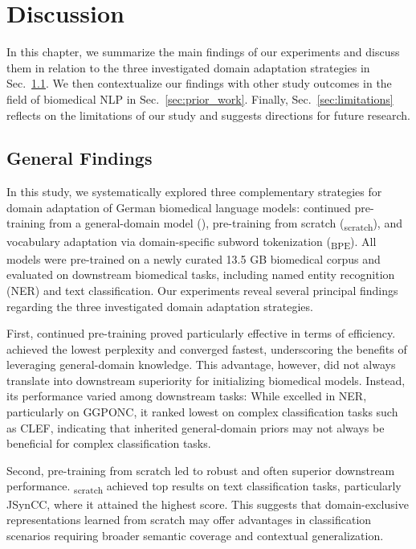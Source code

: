 \chapter{Discussion} \label{chap:discussion}

In this chapter, we summarize the main findings of our experiments and discuss
them in relation to the three investigated domain adaptation strategies in
Sec.~\ref{sec:findings}. We then contextualize our findings with other study
outcomes in the field of biomedical NLP in Sec.~\ref{sec:prior_work}. Finally,
Sec.~\ref{sec:limitations} reflects on the limitations of our study and suggests
directions for future research.

\section{General Findings} \label{sec:findings}

In this study, we systematically explored three complementary strategies for
domain adaptation of German biomedical language models: continued pre-training
from a general-domain model (\ChristBERT{}), pre-training from scratch
(\ChristBERT\textsubscript{scratch}), and vocabulary adaptation via
domain-specific subword tokenization (\ChristBERT\textsubscript{BPE}). All
models were pre-trained on a newly curated 13.5 GB biomedical corpus and
evaluated on downstream biomedical tasks, including named entity recognition
(NER) and text classification. Our experiments reveal several principal findings
regarding the three investigated domain adaptation strategies.

First, continued pre-training proved particularly effective in terms of
efficiency. \ChristBERT{} achieved the lowest perplexity and converged fastest,
underscoring the benefits of leveraging general-domain knowledge. This
advantage, however, did not always translate into downstream superiority for
initializing biomedical models. Instead, its performance varied among downstream
tasks: While \ChristBERT{} excelled in NER, particularly on GGPONC, it ranked
lowest on complex classification tasks such as CLEF, indicating that inherited
general-domain priors may not always be beneficial for complex classification
tasks.

Second, pre-training from scratch led to robust and often superior downstream
performance. \ChristBERT\textsubscript{scratch} achieved top results on text
classification tasks, particularly JSynCC, where it attained the highest \ff{}
score. This suggests that domain-exclusive representations learned from scratch
may offer advantages in classification scenarios requiring broader semantic
coverage and contextual generalization.

